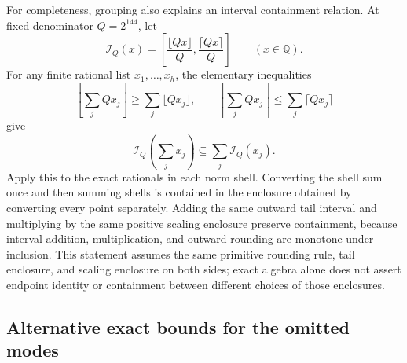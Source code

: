 For completeness, grouping also explains an interval containment relation.
At fixed denominator $Q=2^{144}$, let
\[
 \mathcal I_Q(x)=
 \left[\frac{\lfloor Qx\rfloor}{Q},
       \frac{\lceil Qx\rceil}{Q}\right]
 \qquad(x\in\mathbb Q).
\]
For any finite rational list $x_1,\ldots,x_h$, the elementary inequalities
\[
 \left\lfloor\sum_jQx_j\right\rfloor\geq\sum_j\lfloor Qx_j\rfloor,
 \qquad
 \left\lceil\sum_jQx_j\right\rceil\leq\sum_j\lceil Qx_j\rceil
\]
give
\begin{equation}
 \mathcal I_Q\left(\sum_jx_j\right)
       \subseteq\sum_j\mathcal I_Q(x_j).
 \label{supp:interval-grouping}
\end{equation}
Apply this to the exact rationals in each norm shell.  Converting the shell
sum once and then summing shells is contained in the enclosure obtained by
converting every point separately.  Adding the same outward tail interval
and multiplying by the same positive scaling enclosure preserve containment,
because interval addition, multiplication, and outward rounding are monotone
under inclusion.  This statement assumes the same primitive rounding rule,
tail enclosure, and scaling enclosure on both sides; exact algebra alone
does not assert endpoint identity or containment between different choices
of those enclosures.

\subsection{Alternative exact bounds for the omitted modes}
\label{supp:tail-bounds}

